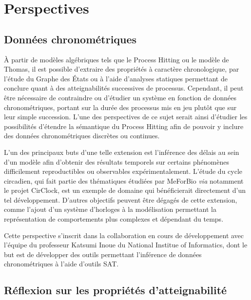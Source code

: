 \chapter{Perspectives}


\section{Données chronométriques}
À partir de modèles algébriques tels que le Process Hitting ou le modèle de Thomas, il est possible d'extraire des propriétés à caractère chronologique,
par l'étude du Graphe des États ou à l'aide d'analyses statiques permettant de conclure quant à des atteignabilités successives de processus.
Cependant, il peut être nécessaire de contraindre ou d'étudier un système en fonction de données chronométriques, portant sur la durée des processus mis en jeu plutôt que sur leur simple succession.
L'une des perspectives de ce sujet serait ainsi d'étudier les possibilités d'étendre la sémantique du Process Hitting afin de pouvoir y inclure des données chronométriques discrètes ou continues.

L'un des principaux buts d'une telle extension est l'inférence des délais au sein d'un modèle afin d'obtenir des résultats temporels sur certains phénomènes difficilement reproductibles ou observables expérimentalement.
L'étude du cycle circadien, qui fait partie des thématiques étudiées par MeForBio \textit{via} notamment le projet CirClock, est un exemple de domaine qui bénéficierait directement d'un tel développement.
D'autres objectifs peuvent être dégagés de cette extension, comme l'ajout d'un système d'horloges à la modélisation permettant la représentation de comportements plus complexes et dépendant du temps.

Cette perspective s'inscrit dans la collaboration en cours de développement avec l'équipe du professeur Katsumi Inoue du National Institue of Informatics,
dont le but est de développer des outils permettant l'inférence de données chronométriques à l'aide d'outils SAT.




\section{Réflexion sur les propriétés d'atteignabilité}

